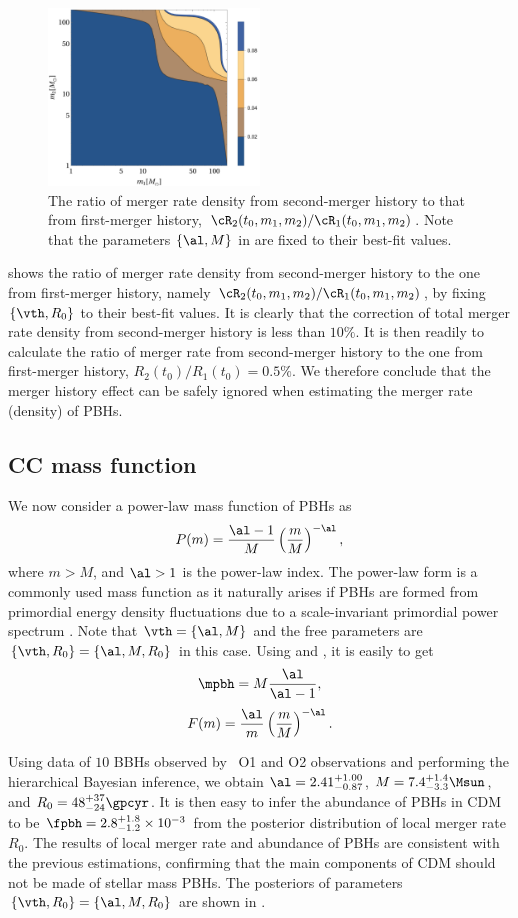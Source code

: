 \documentclass[
reprint,           %
superscriptaddress,%
amsmath,           %
amssymb,           %
aps,               %
prd,               %
notitlepage,       %
longbibliography,  %
floatfix,          %
showkeys,          %
]{revtex4-1}
\def\({\left(}
\def\){\right)}
\def\e{\begin{equation}}
\def\q{\end{equation}}
\begin{document}
\begin{figure}[htbp!]
	\centering
	\includegraphics[width=0.5\textwidth]{ratio-bpower.pdf}
	\caption{\label{ratio-bpower}
		The ratio of merger rate density from second-merger history
		to that from first-merger history,
		$\cR_2(t_0, m_1, m_2)/\cR_1(t_0, m_1, m_2)$. Note that the parameters $\{\al, M\}$ in  are fixed to their best-fit values.
	}
\end{figure}

 shows the ratio of merger rate density from second-merger history
to the one from first-merger history, namely 
$\cR_2(t_0, m_1, m_2)/\cR_1(t_0, m_1, m_2)$, by fixing $\{\vth, R_0\}$ to their best-fit values.
It is clearly that the correction of total merger rate density from 
second-merger history is less than $10\%$.
It is then readily to calculate the ratio of merger rate from 
second-merger history to the one from first-merger history, 
$R_2(t_0)/R_1(t_0) = 0.5\%$.
We therefore conclude that the merger history effect can be safely ignored
when estimating the merger rate (density) of PBHs.

\subsection{CC mass function}
We now consider a power-law mass function of PBHs as \cite{Carr:1975qj}
\e\label{CC} 
P(m) = \frac{\al-1}{M} \(\frac{m}{M}\)^{-\al},
\q
where $m>M$, and $\al>1$ is the power-law index. The power-law form is a commonly used mass function as it naturally arises if PBHs are formed from primordial energy density fluctuations due to a scale-invariant primordial power spectrum \cite{Carr:2016drx,Carr:2017jsz}.
Note that $\vth=\{\al, M\}$ and the free parameters are 
$\{\vth, R_0\} = \{\al, M, R_0\}$ in this case. 
Using  and , it is easily to get
\e
\mpbh = M \frac{\al}{\al-1},
\q
\e 
F(m) = \frac{\al}{m} \(\frac{m}{M}\)^{-\al}.
\q

Using data of $10$ BBHs observed by \lvc\ O1 and O2 observations and performing
the hierarchical Bayesian inference, we obtain $\al = 2.41^{+1.00}_{-0.87}$,
$M = 7.4^{+1.4}_{-3.3} \Msun$, and $R_0 = 48^{+37}_{-24} \gpcyr$.
It is then easy to infer the abundance of PBHs in CDM to be 
$\fpbh = 2.8^{+1.8}_{-1.2} \times 10^{-3}$ from the posterior distribution of local merger rate $R_0$.
The results of local merger rate and abundance of PBHs are consistent with
the previous estimations, confirming that the main components of CDM should
not be made of stellar mass PBHs.
The posteriors of parameters $\{\vth, R_0\} = \{\al, M, R_0\}$ are shown 
in .
\end{document}
